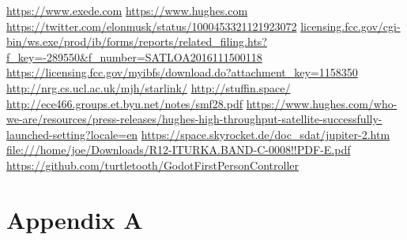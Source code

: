 \documentclass[12pt]{article}
\begin{document}
\begin{thebibliography}{99}
	 \url{https://www.exede.com}
	 \url{https://www.hughes.com}
	 \url{https://twitter.com/elonmusk/status/1000453321121923072}
	 \url{licensing.fcc.gov/cgi-bin/ws.exe/prod/ib/forms/reports/related_filing.hts?f_key=-289550&f_number=SATLOA2016111500118}
	 \url{https://licensing.fcc.gov/myibfs/download.do?attachment_key=1158350}
	 \url{http://nrg.cs.ucl.ac.uk/mjh/starlink/}
	 \url{http://stuffin.space/}
	 \url{http://ece466.groups.et.byu.net/notes/smf28.pdf}
	 \url{https://www.hughes.com/who-we-are/resources/press-releases/hughes-high-throughput-satellite-successfully-launched-setting?locale=en}
	 \url{https://space.skyrocket.de/doc_sdat/jupiter-2.htm}
	 \url{file:///home/joe/Downloads/R12-ITURKA.BAND-C-0008!!PDF-E.pdf}
	 \url{https://github.com/turtletooth/GodotFirstPersonController}
\end{thebibliography}
\appendix

\section{Appendix A}

\printindex

\end{document}
